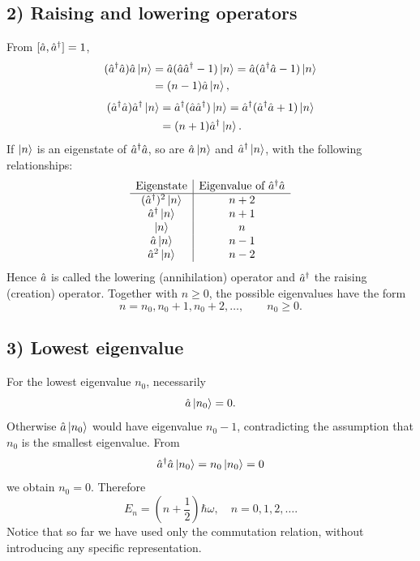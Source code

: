 \subsection*{2) Raising and lowering operators}
From $[\hat{a},\hat{a}^{\dagger}]=1$,
\begin{equation}
\begin{split}
(\hat{a}^{\dagger}\hat{a})\hat{a}\left|n\right\rangle
&=\hat{a}(\hat{a}\hat{a}^{\dagger}-1)\left|n\right\rangle
=\hat{a}(\hat{a}^{\dagger}\hat{a}-1)\left|n\right\rangle\\
&=(n-1)\hat{a}\left|n\right\rangle,
\end{split}
\end{equation}
\begin{equation}
\begin{split}
(\hat{a}^{\dagger}\hat{a})\hat{a}^{\dagger}\left|n\right\rangle
&=\hat{a}^{\dagger}(\hat{a}\hat{a}^{\dagger})\left|n\right\rangle
=\hat{a}^{\dagger}(\hat{a}^{\dagger}\hat{a}+1)\left|n\right\rangle\\
&=(n+1)\hat{a}^{\dagger}\left|n\right\rangle.
\end{split}
\end{equation}
If $\left|n\right\rangle$ is an eigenstate of $\hat{a}^{\dagger}\hat{a}$, so are $\hat{a}\left|n\right\rangle$ and $\hat{a}^{\dagger}\left|n\right\rangle$, with the following relationships:
\begin{equation}
\begin{array}{c|c}
\text{Eigenstate}&\text{Eigenvalue of }\hat{a}^{\dagger}\hat{a}\\\hline
(\hat{a}^{\dagger})^2\left|n\right\rangle&n+2\\
\hat{a}^{\dagger}\left|n\right\rangle&n+1\\
\left|n\right\rangle&n\\
\hat{a}\left|n\right\rangle&n-1\\
\hat{a}^2\left|n\right\rangle&n-2
\end{array}
\end{equation}
Hence $\hat{a}$ is called the lowering (annihilation) operator and $\hat{a}^{\dagger}$ the raising (creation) operator. Together with $n\ge0$, the possible eigenvalues have the form
\begin{equation}
n=n_0,n_0+1,n_0+2,\ldots,\qquad n_0\ge0.
\end{equation}

\subsection*{3) Lowest eigenvalue}
For the lowest eigenvalue $n_0$, necessarily
\begin{equation}
\hat{a}\left|n_0\right\rangle=0.
\end{equation}
Otherwise $\hat{a}\left|n_0\right\rangle$ would have eigenvalue $n_0-1$, contradicting the assumption that $n_0$ is the smallest eigenvalue. From
\begin{equation}
\hat{a}^{\dagger}\hat{a}\left|n_0\right\rangle=n_0\left|n_0\right\rangle=0
\end{equation}
we obtain $n_0=0$. Therefore
\begin{equation}
\boxed{E_n=\left(n+\frac12\right)\hbar\omega,\quad n=0,1,2,\ldots.}
\end{equation}
Notice that so far we have used only the commutation relation, without introducing any specific representation.

